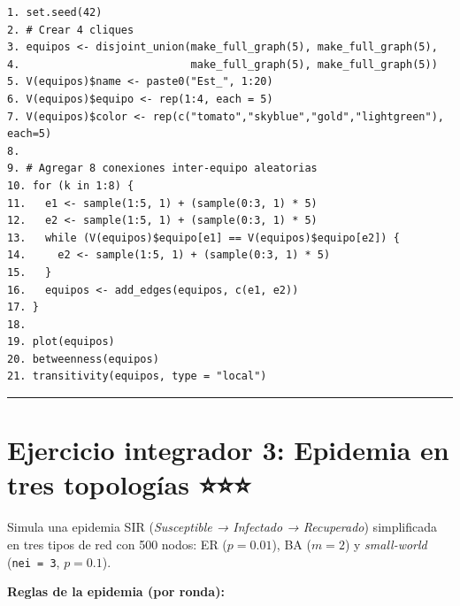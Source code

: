 \documentclass[
  letterpaper,
  DIV=11,
  numbers=noendperiod]{scrreprt}
\begin{document}
\begin{tcolorbox}[enhanced jigsaw, toprule=.15mm, colframe=quarto-callout-note-color-frame, coltitle=black, titlerule=0mm, colback=white, breakable, leftrule=.75mm, arc=.35mm, bottomtitle=1mm, toptitle=1mm, rightrule=.15mm, bottomrule=.15mm, left=2mm, title=\textcolor{quarto-callout-note-color}{\faInfo}\hspace{0.5em}{💡 Pista 3 --- Pseudocódigo}, colbacktitle=quarto-callout-note-color!10!white, opacityback=0, opacitybacktitle=0.6]

\begin{verbatim}
1. set.seed(42)
2. # Crear 4 cliques
3. equipos <- disjoint_union(make_full_graph(5), make_full_graph(5),
4.                           make_full_graph(5), make_full_graph(5))
5. V(equipos)$name <- paste0("Est_", 1:20)
6. V(equipos)$equipo <- rep(1:4, each = 5)
7. V(equipos)$color <- rep(c("tomato","skyblue","gold","lightgreen"), each=5)
8. 
9. # Agregar 8 conexiones inter-equipo aleatorias
10. for (k in 1:8) {
11.   e1 <- sample(1:5, 1) + (sample(0:3, 1) * 5)
12.   e2 <- sample(1:5, 1) + (sample(0:3, 1) * 5)
13.   while (V(equipos)$equipo[e1] == V(equipos)$equipo[e2]) {
14.     e2 <- sample(1:5, 1) + (sample(0:3, 1) * 5)
15.   }
16.   equipos <- add_edges(equipos, c(e1, e2))
17. }
18. 
19. plot(equipos)
20. betweenness(equipos)
21. transitivity(equipos, type = "local")
\end{verbatim}

\end{tcolorbox}

\begin{center}\rule{0.5\linewidth}{0.5pt}\end{center}

\section*{Ejercicio integrador 3: Epidemia en tres topologías
⭐⭐⭐}\label{ejercicio-integrador-3-epidemia-en-tres-topologuxedas}


Simula una epidemia SIR (\emph{Susceptible → Infectado → Recuperado})
simplificada en tres tipos de red con 500 nodos: ER (\(p = 0.01\)), BA
(\(m = 2\)) y \emph{small-world} (\texttt{nei\ =\ 3}, \(p = 0.1\)).

\textbf{Reglas de la epidemia (por ronda):}
\end{document}
